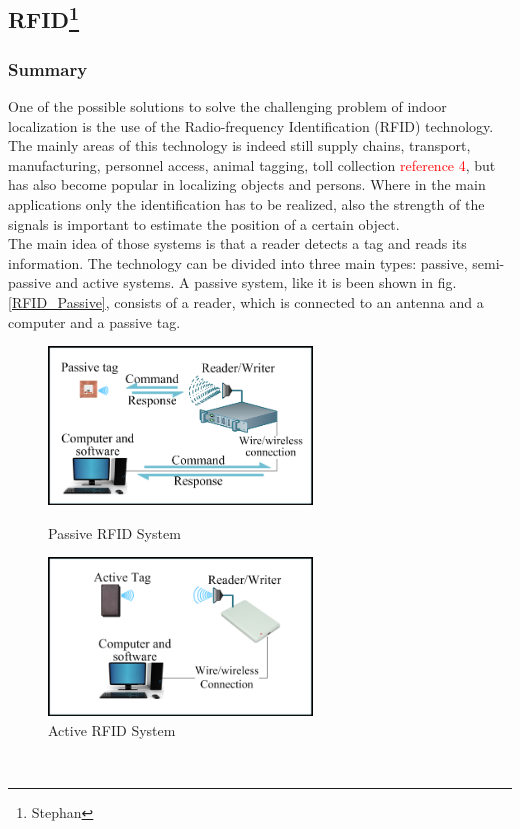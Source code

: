 \subsection[RFIS]{RFID\footnote{Stephan}} %
\subsubsection*{Summary} 
One of the possible solutions to solve the challenging problem of indoor localization is the use of the Radio-frequency Identification (RFID) technology. The mainly areas of this technology is indeed still supply chains, transport, manufacturing, personnel access, animal tagging, toll collection \textcolor{red}{reference 4}, but has also become popular in localizing objects and persons. Where in the main applications only the identification has to be realized, also the strength of the signals is important to estimate the position of a certain object.\\
The main idea of those systems is that a reader detects a tag and reads its information. The technology can be divided into three main types: passive, semi-passive and active systems. A passive system, like it is been shown in fig. \ref{RFID_Passive}, consists of a reader, which is connected to an antenna and a computer and a passive tag.\\
\begin{figure}[!htbp]
\centering
\begin{minipage}{.5\textwidth}
\centering
\includegraphics[width = 7cm]{Pictures/RFID_Passive}%
\caption{Passive RFID System}
\label{RFID_Passive}
\end{minipage}%
\begin{minipage}{.5\textwidth}
\centering
\includegraphics[width = 7cm]{Pictures/RFID_Active}%
\caption{Active RFID System}
\label{RFID_Active}
\end{minipage}
\end{figure}\\
